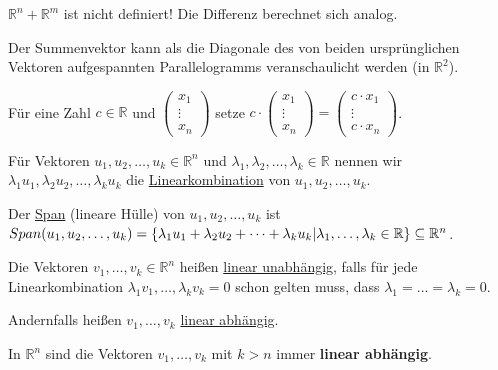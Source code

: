 \documentclass{mg2}
\begin{document}
$\mathbb{R}^n + \mathbb{R}^m$ ist nicht definiert! Die Differenz berechnet sich analog.

Der Summenvektor kann als die Diagonale des von beiden ursprünglichen Vektoren aufgespannten Parallelogramms veranschaulicht werden (in $\mathbb{R}^2$).

\begin{definition}[Skalarmultiplikation]Für eine Zahl $c \in \mathbb{R}$ und $\begin{pmatrix}x_1\\ \vdots \\ x_n\end{pmatrix}$ setze $c \cdot \begin{pmatrix}x_1\\ \vdots \\ x_n\end{pmatrix} =\begin{pmatrix}c \cdot x_1\\ \vdots \\c \cdot  x_n\end{pmatrix}$.
\end{definition}

\begin{definition}
Für Vektoren $u_1, u_2,\dots,u_k \in \mathbb{R}^n$ und $\lambda_1,\lambda_2,\dots,\lambda_k \in \mathbb{R}$ nennen wir $\lambda_1 u_1, \lambda_2 u_2,\dots,\lambda_k u_k$ die \underline{Linearkombination} von $u_1, u_2,\dots,u_k$.

Der \underline{Span} (lineare Hülle) von $u_1, u_2, \dots, u_k$ ist $Span(u_1, u_2, \dots, u_k) \\
= \{ \lambda_1 u_1 + \lambda_2 u_2 + \dots + \lambda_k u_k | \lambda_1, \dots, \lambda_k \in \mathbb{R} \} \subseteq \mathbb{R}^n$.
\end{definition}

\begin{definition}
Die Vektoren $v_1, \dots, v_k \in \mathbb{R}^n$ heißen \underline{linear unabhängig}, falls für jede Linearkombination $\lambda_1 v_1, \dots, \lambda_k v_k = 0$ schon gelten muss, dass $\lambda_1 = \dots = \lambda_k = 0$.

Andernfalls heißen $v_1,\dots,v_k$ \underline{linear abhängig}.
\end{definition}

\begin{beobachtung} 
In $\mathbb{R}^n$ sind die Vektoren $v_1,\dots,v_k$ mit $k > n$ immer \textbf{linear abhängig}.
\end{beobachtung}
\end{document}
